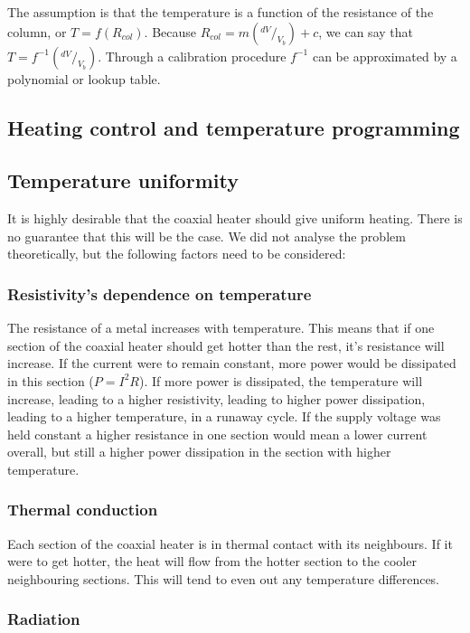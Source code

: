 The assumption is that the temperature is a function of the resistance of the
column, or $T = f(R_{col})$. Because $R_{col}=m(^{dV}/_{V_b}) + c$, we can say
that $T = f^{-1}(^{dV}/_{V_b})$. Through a calibration procedure $f^{-1}$ can be
approximated by a polynomial or lookup table.

\subsection{Heating control and temperature programming}

\subsection{Temperature uniformity}
\label{sec:Uniformity}

It is highly desirable that the coaxial heater should give uniform heating.
There is no guarantee that this will be the case. We did not analyse the problem
theoretically, but the following factors need to be considered:

\subsubsection{Resistivity's dependence on temperature}

The  resistance of a metal increases with temperature. This means that if one
section of the coaxial heater should get hotter than the rest, it's resistance
will increase. If the current were to remain constant, more power would be
dissipated in this section (\(P=I^2R\)). If more power is dissipated, the
temperature will increase, leading to a higher resistivity, leading to higher
power dissipation, leading to a higher temperature, in a runaway cycle. If the
supply voltage was held constant a higher resistance in one section would mean a
lower current overall, but still a higher power dissipation in the section with higher temperature. 

\subsubsection{Thermal conduction}

Each section of the coaxial heater is in thermal contact with its neighbours. If
it were to get hotter, the heat will flow from the hotter section to the cooler
neighbouring sections. This will tend to even out any temperature differences.

\subsubsection{Radiation}

